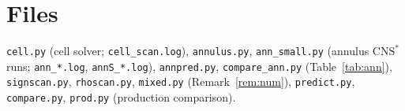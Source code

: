 \documentclass[11pt,reqno]{amsart}
\theoremstyle{plain}
\theoremstyle{definition}
\newcommand{\CNS}{\mathrm{CNS}^\ast}
\begin{document}
\section*{Files}
\texttt{cell.py} (cell solver; \texttt{cell\_scan.log}), \texttt{annulus.py}, \texttt{ann\_small.py} (annulus $\CNS$ runs; \texttt{ann\_*.log}, \texttt{annS\_*.log}), \texttt{annpred.py}, \texttt{compare\_ann.py} (Table~\ref{tab:ann}), \texttt{signscan.py}, \texttt{rhoscan.py}, \texttt{mixed.py} (Remark~\ref{rem:num}), \texttt{predict.py}, \texttt{compare.py}, \texttt{prod.py} (production comparison).
\end{document}
